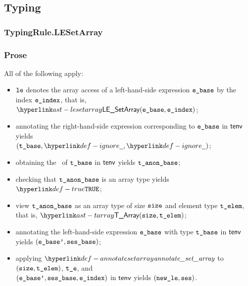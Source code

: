 \subsection{Typing}
\subsubsection{TypingRule.LESetArray\label{sec:TypingRule.LESetArray}}
\subsubsection{Prose}
All of the following apply:
\begin{itemize}
  \item $\texttt{le}$ denotes the array access of a left-hand-side expression $\texttt{e\_base}$ by the index $\texttt{e\_index}$, that is, $\LESetArray(\ebase, \eindex)$;
  \item annotating the right-hand-side expression corresponding to $\texttt{e\_base}$ in $\textsf{tenv}$ yields \\ $(\tbase, \Ignore, \Ignore)$\ProseOrTypeError;
  \item obtaining the \underlyingtype\ of $\texttt{t\_base}$ in $\textsf{tenv}$ yields $\texttt{t\_anon\_base}$\ProseOrTypeError;
  \item checking that $\texttt{t\_anon\_base}$ is an array type yields $\True$\ProseOrTypeError;
  \item view $\texttt{t\_anon\_base}$ as an array type of size $\texttt{size}$ and element type $\texttt{t\_elem}$, that is, $\TArray(\size, \telem)$;
  \item annotating the left-hand-side expression $\texttt{e\_base}$ with type $\texttt{t\_base}$ in $\textsf{tenv}$ yields $(\texttt{e\_base'}, \texttt{ses\_base})$\ProseOrTypeError;
  \item applying $\annotatesetarray$ to $(\texttt{size}, \texttt{t\_elem})$, $\texttt{t\_e}$, and \\
        $(\texttt{e\_base'}, \texttt{ses\_base}, \texttt{e\_index})$ in $\textsf{tenv}$ yields $(\texttt{new\_le}, \texttt{ses})$\ProseOrTypeError.
\end{itemize}

